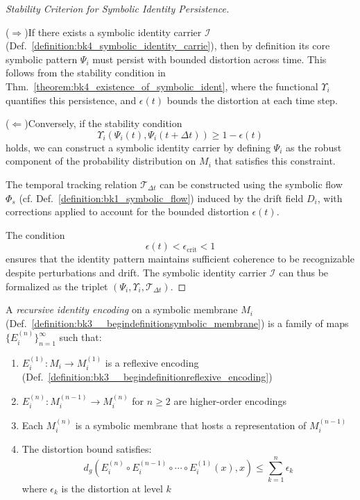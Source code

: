 \begin{proof}[Stability Criterion for Symbolic Identity Persistence]
\label{proof:bk4_symbolic_identity_persistence}

($\Rightarrow$)\enspace If there exists a symbolic identity carrier $\mathcal{I}$ (Def.~\ref{definition:bk4_symbolic_identity_carrie}), then by definition its core symbolic pattern $\Psi_i$ must persist with bounded distortion across time. This follows from the stability condition in Thm.~\ref{theorem:bk4_existence_of_symbolic_ident}, where the functional $\Upsilon_i$ quantifies this persistence, and $\epsilon(t)$ bounds the distortion at each time step.

\medskip

($\Leftarrow$)\enspace Conversely, if the stability condition
\[
\Upsilon_i(\Psi_i(t), \Psi_i(t+\Delta t)) \geq 1 - \epsilon(t)
\]
holds, we can construct a symbolic identity carrier by defining $\Psi_i$ as the robust component of the probability distribution on $M_i$ that satisfies this constraint.

The temporal tracking relation $\mathcal{T}_{\Delta t}$ can be constructed using the symbolic flow $\Phi_s$ (cf. Def.~\ref{definition:bk1_symbolic_flow}) induced by the drift field $D_i$, with corrections applied to account for the bounded distortion $\epsilon(t)$.

\medskip

The condition
\[
\epsilon(t) < \epsilon_{\text{crit}} < 1
\]
ensures that the identity pattern maintains sufficient coherence to be recognizable despite perturbations and drift. The symbolic identity carrier $\mathcal{I}$ can thus be formalized as the triplet $(\Psi_i, \Upsilon_i, \mathcal{T}_{\Delta t})$.
\end{proof}
\begin{definition}
\label{definition:bk4_recursive_identity_encod}
A \emph{recursive identity encoding} on a symbolic membrane $M_i$ (Def.~\ref{definition:bk3__begindefinitionsymbolic_membrane}) is a family of maps $\{E_i^{(n)}\}_{n=1}^{\infty}$ such that:
\begin{enumerate}
    \item $E_i^{(1)}: M_i \to M_i^{(1)}$ is a reflexive encoding (Def.~\ref{definition:bk3__begindefinitionreflexive_encoding})
    \item $E_i^{(n)}: M_i^{(n-1)} \to M_i^{(n)}$ for $n \geq 2$ are higher-order encodings
    \item Each $M_i^{(n)}$ is a symbolic membrane that hosts a representation of $M_i^{(n-1)}$
    \item The distortion bound satisfies:
    \[
    d_g\left(E_i^{(n)} \circ E_i^{(n-1)} \circ \cdots \circ E_i^{(1)}(x), x\right) \leq \sum_{k=1}^{n} \epsilon_k
    \]
    where $\epsilon_k$ is the distortion at level $k$
\end{enumerate}
\end{definition}
